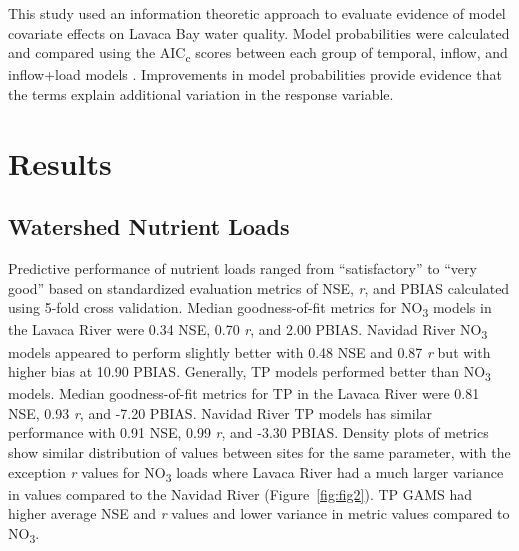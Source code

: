 \documentclass[sn-basic,referee,lineno,pdflatex]{sn-jnl}
\begin{document}
This study used an information theoretic approach to evaluate evidence
of model covariate effects on Lavaca Bay water quality. Model
probabilities were calculated and compared using the
AIC\textsubscript{c} scores between each group of temporal, inflow, and
inflow+load models \citep{burnhamAICModelSelection2011}. Improvements in
model probabilities provide evidence that the terms explain additional
variation in the response variable.

\hypertarget{sec3}{%
\section{Results}\label{sec3}}

\hypertarget{watershed-nutrient-loads}{%
\subsection{Watershed Nutrient Loads}\label{watershed-nutrient-loads}}

Predictive performance of nutrient loads ranged from ``satisfactory'' to
``very good'' based on standardized evaluation metrics of NSE, \emph{r},
and PBIAS \citep{moriasiHydrologicWaterQuality2015} calculated using
5-fold cross validation. Median goodness-of-fit metrics for
NO\textsubscript{3} models in the Lavaca River were 0.34 NSE, 0.70
\emph{r}, and 2.00 PBIAS. Navidad River NO\textsubscript{3} models
appeared to perform slightly better with 0.48 NSE and 0.87 \emph{r} but
with higher bias at 10.90 PBIAS. Generally, TP models performed better
than NO\textsubscript{3} models. Median goodness-of-fit metrics for TP
in the Lavaca River were 0.81 NSE, 0.93 \emph{r}, and -7.20 PBIAS.
Navidad River TP models has similar performance with 0.91 NSE, 0.99
\emph{r}, and -3.30 PBIAS. Density plots of metrics show similar
distribution of values between sites for the same parameter, with the
exception \emph{r} values for NO\textsubscript{3} loads where Lavaca
River had a much larger variance in values compared to the Navidad River
(Figure~\ref{fig:fig2}). TP GAMS had higher average NSE and \emph{r}
values and lower variance in metric values compared to
NO\textsubscript{3}.
\end{document}
